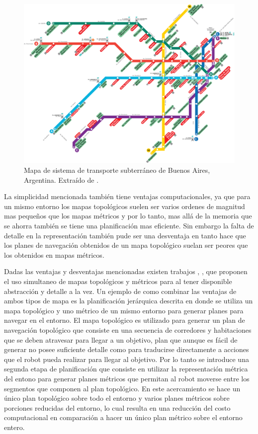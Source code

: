\begin{figure}[H]
  \center
  \includegraphics[width=1\linewidth]{imagenes/metroBsAs.png}
  \caption{Mapa de sistema de transporte subterráneo de Buenos Aires, Argentina. Extraído de \cite{metroBsAs}.}\label{fig:metroBsAs}
\end{figure} 

La simplicidad mencionada también tiene ventajas computacionales,  ya que para un mismo entorno los mapas topológicos suelen ser varios ordenes de magnitud mas pequeños que los mapas métricos y por lo tanto, mas allá de la memoria que se ahorra también se tiene una planificación mas eficiente. Sin embargo la falta de detalle en la representación también pude ser una desventaja en tanto hace que los planes de navegación obtenidos de un mapa topológico suelan ser peores que los obtenidos en mapas métricos.

Dadas las ventajas y desventajas mencionadas existen trabajos \cite{Thrun1998}, \cite{wurm2008coordinated}, \cite{Liu2015} que proponen el uso simultaneo de mapas topológicos y métricos para  al tener disponible abstracción y detalle a la vez. Un ejemplo de como combinar las ventajas de ambos tipos de mapa es la planificación jerárquica descrita en \cite{Thrun1998} donde se utiliza un mapa topológico y uno métrico de un mismo entorno para generar planes para navegar en el entorno. El mapa topológico es utilizado para generar un plan de navegación topológico que consiste en una secuencia de corredores y habitaciones que se deben atravesar para llegar a un objetivo, plan que aunque es fácil de generar no posee suficiente detalle como para traducirse directamente a acciones que el robot pueda realizar para llegar al objetivo. Por lo tanto se introduce una segunda etapa de planificación que consiste en utilizar la representación métrica  del entono para generar planes métricos que permitan al robot moverse entre los segmentos que componen al plan topológico. En este acercamiento se hace un único plan topológico sobre todo el entorno y varios planes métricos sobre porciones reducidas del entorno, lo cual resulta en una reducción del costo computacional en comparación a hacer un único plan métrico sobre el entorno entero.

